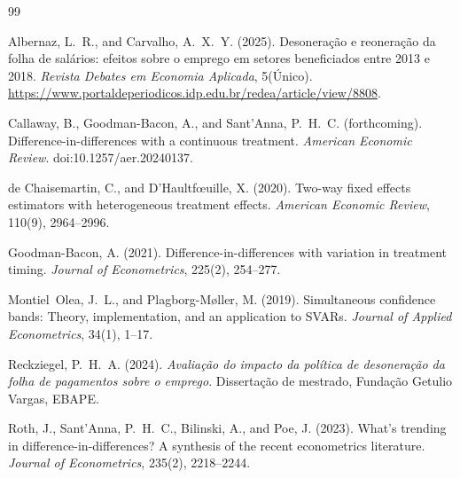 \documentclass[12pt,a4paper]{article}
\begin{document}
\begin{thebibliography}{99}

Albernaz, L.~R., and Carvalho, A.~X.~Y. (2025).
Desonera\c{c}\~ao e reonera\c{c}\~ao da folha de sal\'arios: efeitos sobre o emprego em setores beneficiados entre 2013 e 2018.
\textit{Revista Debates em Economia Aplicada}, 5(Único).
\url{https://www.portaldeperiodicos.idp.edu.br/redea/article/view/8808}.

Callaway, B., Goodman-Bacon, A., and Sant'Anna, P.~H.~C. (forthcoming).
Difference-in-differences with a continuous treatment.
\textit{American Economic Review}. doi:10.1257/aer.20240137.

de Chaisemartin, C., and D'Haultf\oe uille, X. (2020).
Two-way fixed effects estimators with heterogeneous treatment effects.
\textit{American Economic Review}, 110(9), 2964--2996.

Goodman-Bacon, A. (2021).
Difference-in-differences with variation in treatment timing.
\textit{Journal of Econometrics}, 225(2), 254--277.

Montiel~Olea, J.~L., and Plagborg-M{\o}ller, M. (2019).
Simultaneous confidence bands: Theory, implementation, and an application to SVARs.
\textit{Journal of Applied Econometrics}, 34(1), 1--17.

Reckziegel, P.~H.~A. (2024).
\textit{Avaliação do impacto da política de desoneração da folha de pagamentos sobre o emprego}.
Dissertação de mestrado, Fundação Getulio Vargas, EBAPE.

Roth, J., Sant'Anna, P.~H.~C., Bilinski, A., and Poe, J. (2023).
What's trending in difference-in-differences? A synthesis of the recent econometrics literature.
\textit{Journal of Econometrics}, 235(2), 2218--2244.

\end{thebibliography}
\end{document}
